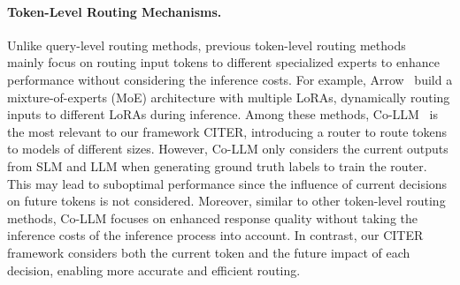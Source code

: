 \paragraph{Token-Level Routing Mechanisms.} Unlike query-level routing methods, previous token-level routing methods~\citep{pfeiffer2021adapterfusion,belofsky2023tokenleveladaptationloraadapters,muqeeth2024learningroutespecializedexperts,wang2024loraflowdynamiclorafusion,wu2024mixtureloraexperts,xu2024meteoramultipletasksembeddedlora} mainly focus on routing input tokens to different specialized experts to enhance performance without considering the inference costs. For example, Arrow~\citep{ostapenko2024modularllmsbuildingreusing} build a mixture-of-experts (MoE) architecture with multiple LoRAs, dynamically routing inputs to different LoRAs during inference.
Among these methods, Co-LLM~\citep{shen2024learning} is the most relevant to our framework CITER, introducing a router to route tokens to models of different sizes. However, Co-LLM only considers the current outputs from SLM and LLM when generating ground truth labels to train the router. This may lead to suboptimal performance since the influence of current decisions on future tokens is not considered. Moreover, similar to other token-level routing methods, Co-LLM focuses on enhanced response quality without taking the inference costs of the inference process into account. In contrast, our CITER framework considers both the current token and the future impact of each decision, enabling more accurate and efficient routing.
\vspace{-1em}
